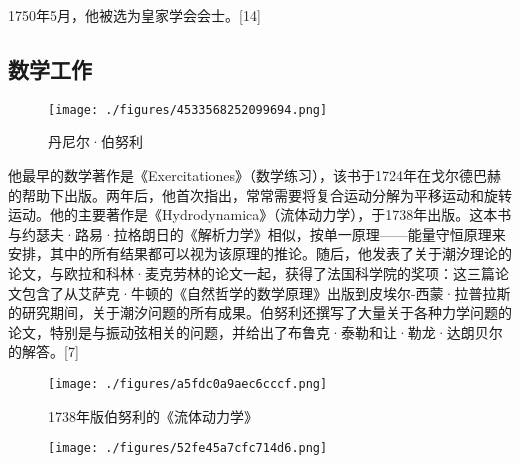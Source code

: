 1750年5月，他被选为皇家学会会士。[14]
\subsection{数学工作}
\begin{figure}[ht]
\centering
\texttt{[image: ./figures/4533568252099694.png]}
\caption{丹尼尔·伯努利} \label{fig_BNL_3}
\end{figure}
他最早的数学著作是《Exercitationes》（数学练习），该书于1724年在戈尔德巴赫的帮助下出版。两年后，他首次指出，常常需要将复合运动分解为平移运动和旋转运动。他的主要著作是《Hydrodynamica》（流体动力学），于1738年出版。这本书与约瑟夫·路易·拉格朗日的《解析力学》相似，按单一原理——能量守恒原理来安排，其中的所有结果都可以视为该原理的推论。随后，他发表了关于潮汐理论的论文，与欧拉和科林·麦克劳林的论文一起，获得了法国科学院的奖项：这三篇论文包含了从艾萨克·牛顿的《自然哲学的数学原理》出版到皮埃尔-西蒙·拉普拉斯的研究期间，关于潮汐问题的所有成果。伯努利还撰写了大量关于各种力学问题的论文，特别是与振动弦相关的问题，并给出了布鲁克·泰勒和让·勒龙·达朗贝尔的解答。[7]
\begin{figure}[ht]
\centering
\texttt{[image: ./figures/a5fdc0a9aec6cccf.png]}
\caption{1738年版伯努利的《流体动力学》} \label{fig_BNL_4}
\end{figure}
\begin{figure}[ht]
\centering
\texttt{[image: ./figures/52fe45a7cfc714d6.png]}
\caption{} \label{fig_BNL_5}
\end{figure}